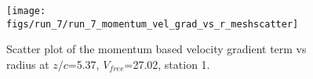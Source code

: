 \begin{figure}[H]
\centering
\texttt{[image: figs/run\_7/run\_7\_momentum\_vel\_grad\_vs\_r\_meshscatter]}
\caption{Scatter plot of the momentum based velocity gradient term vs radius at $z/c$=5.37, $V_{free}$=27.02, station 1.}
\label{fig:run_7_momentum_vel_grad_vs_r_meshscatter}
\end{figure}


